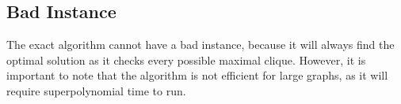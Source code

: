 \subsection{Bad Instance}

The exact algorithm cannot have a bad instance, because it will always find the 
optimal solution as it checks every possible maximal clique. However, it is
important to note that the algorithm is not efficient for large graphs, as it
will require superpolynomial time to run.
